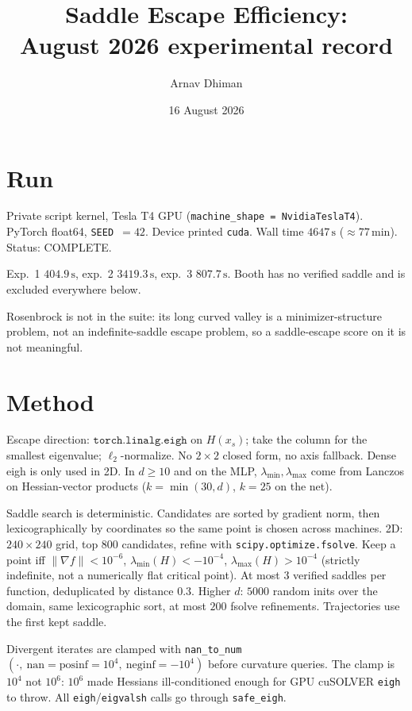 \documentclass[11pt]{article}
\title{Saddle Escape Efficiency:\\August 2026 experimental record}
\author{Arnav Dhiman}
\date{16 August 2026}
\begin{document}
\maketitle

\section{Run}

Private script kernel, Tesla T4 GPU (\texttt{machine\_shape = NvidiaTeslaT4}).
PyTorch float64, \texttt{SEED $= 42$}. Device printed \texttt{cuda}.
Wall time $4647\,\mathrm{s}$ ($\approx 77\,\mathrm{min}$). Status: COMPLETE.

Exp.~1 $404.9\,\mathrm{s}$, exp.~2 $3419.3\,\mathrm{s}$, exp.~3 $807.7\,\mathrm{s}$.
Booth has no verified saddle and is excluded everywhere below.

Rosenbrock is not in the suite: its long curved valley is a minimizer-structure
problem, not an indefinite-saddle escape problem, so a saddle-escape score on
it is not meaningful.

\section{Method}

Escape direction: $\texttt{torch.linalg.eigh}$ on $H(x_s)$; take the column
for the smallest eigenvalue; $\ell_2$-normalize. No $2\times 2$ closed form,
no axis fallback. Dense eigh is only used in 2D. In $d\ge 10$ and on the MLP,
$\lambda_{\min},\lambda_{\max}$ come from Lanczos on Hessian-vector products
($k=\min(30,d)$, $k=25$ on the net).

Saddle search is deterministic. Candidates are sorted by gradient norm, then
lexicographically by coordinates so the same point is chosen across machines.
2D: $240\times 240$ grid, top $800$ candidates, refine with
\texttt{scipy.optimize.fsolve}. Keep a point iff
$\lVert\nabla f\rVert < 10^{-6}$, $\lambda_{\min}(H) < -10^{-4}$,
$\lambda_{\max}(H) > 10^{-4}$ (strictly indefinite, not a numerically flat
critical point). At most $3$ verified saddles per function, deduplicated by
distance $0.3$. Higher $d$: $5000$ random inits over the domain, same
lexicographic sort, at most $200$ fsolve refinements. Trajectories use the
first kept saddle.

Divergent iterates are clamped with
\texttt{nan\_to\_num}$(\cdot,\ \mathrm{nan}=\mathrm{posinf}=10^{4},\ \mathrm{neginf}=-10^{4})$
before curvature queries. The clamp is $10^{4}$ not $10^{6}$: $10^{6}$ made
Hessians ill-conditioned enough for GPU cuSOLVER \texttt{eigh} to throw.
All \texttt{eigh}/\texttt{eigvalsh} calls go through \texttt{safe\_eigh}.
\end{document}
